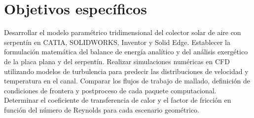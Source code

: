 \section{Objetivos específicos}
\label{sec:cap01_objetivos_especificos}

Desarrollar el modelo paramétrico tridimensional del colector solar de aire con serpentín en CATIA, SOLIDWORKS, Inventor y Solid Edge.
Establecer la formulación matemática del balance de energía analítico y del análisis exergético de la placa plana y del serpentín.
Realizar simulaciones numéricas en CFD utilizando modelos de turbulencia para predecir las distribuciones de velocidad y temperatura en el canal.
Comparar los flujos de trabajo de mallado, definición de condiciones de frontera y postproceso de cada paquete computacional.
Determinar el coeficiente de transferencia de calor y el factor de fricción en función del número de Reynolds para cada escenario geométrico.
